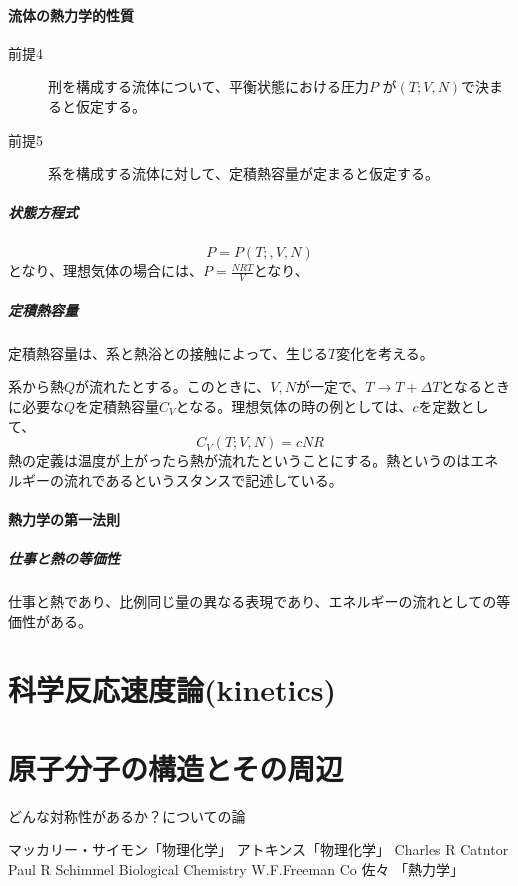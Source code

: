 \documentclass{ltjsarticle}
\begin{document}
\subsection{流体の熱力学的性質}
\begin{description}
  \item[前提4] 刑を構成する流体について、平衡状態における圧力\(P\) が\((T;V,N)\)で決まると仮定する。
  \item[前提5] 系を構成する流体に対して、定積熱容量が定まると仮定する。
\end{description}
\subsubsection{状態方程式}


\begin{equation}
  P = P(T;,V,N) 
\end{equation}
となり、理想気体の場合には、\(P= \frac{NRT}{V}\)となり、

\subsubsection{定積熱容量}
定積熱容量は、系と熱浴との接触によって、生じる\(T\)変化を考える。


系から熱\(Q\)が流れたとする。このときに、\(V,N\)が一定で、\(T\to T+ \varDelta T\)となるときに必要な\(Q\)を定積熱容量\(C_V\)となる。理想気体の時の例としては、\(c\)を定数として、
\begin{equation}
  C_V(T;V,N) = cNR
\end{equation}
熱の定義は温度が上がったら熱が流れたということにする。熱というのはエネルギーの流れであるというスタンスで記述している。


\subsection{熱力学の第一法則}
\subsubsection{仕事と熱の等価性}
仕事と熱であり、比例同じ量の異なる表現であり、エネルギーの流れとしての等価性がある。





\part{科学反応速度論(kinetics)}




\part{原子分子の構造とその周辺}
どんな対称性があるか？についての論


\begin{thebibliography}{9}
 マッカリー・サイモン「物理化学」
 アトキンス「物理化学」
 Charles R Catntor Paul R Schimmel Biological Chemistry W.F.Freeman Co 
 佐々 「熱力学」
\end{thebibliography}
\end{document}
